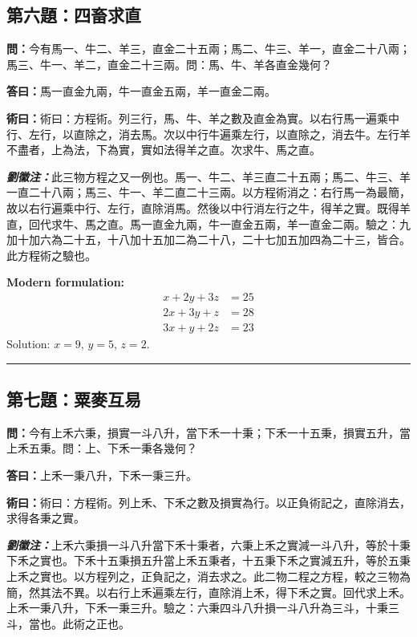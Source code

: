 \documentclass[11pt,a4paper]{article}
\newcommand{\wen}[1]{\textbf{\color{problemcolor}問：}#1\par}
\newcommand{\da}[1]{\textbf{答曰：}#1\par}
\newcommand{\shu}[1]{\textbf{術曰：}#1\par}
\newcommand{\liuhui}[1]{{\color{commentarycolor}\textit{\textbf{劉徽注：}}#1\par}}
\begin{document}
\subsection{第六題：四畜求直}

\wen{今有馬一、牛二、羊三，直金二十五兩；馬二、牛三、羊一，直金二十八兩；馬三、牛一、羊二，直金二十三兩。問：馬、牛、羊各直金幾何？}

\da{馬一直金九兩，牛一直金五兩，羊一直金二兩。}

\shu{術曰：方程術。列三行，馬、牛、羊之數及直金為實。以右行馬一遍乘中行、左行，以直除之，消去馬。次以中行牛遍乘左行，以直除之，消去牛。左行羊不盡者，上為法，下為實，實如法得羊之直。次求牛、馬之直。}

\liuhui{此三物方程之又一例也。馬一、牛二、羊三直二十五兩；馬二、牛三、羊一直二十八兩；馬三、牛一、羊二直二十三兩。以方程術消之：右行馬一為最簡，故以右行遍乘中行、左行，直除消馬。然後以中行消左行之牛，得羊之實。既得羊直，回代求牛、馬之直。馬一直金九兩，牛一直金五兩，羊一直金二兩。驗之：九加十加六為二十五，十八加十五加二為二十八，二十七加五加四為二十三，皆合。此方程術之驗也。}

\textbf{Modern formulation:}
\begin{align*}
x + 2y + 3z &= 25 \\
2x + 3y + z &= 28 \\
3x + y + 2z &= 23
\end{align*}
Solution: $x = 9$, $y = 5$, $z = 2$.

\bigskip
\hrule
\bigskip

\subsection{第七題：粟麥互易}

\wen{今有上禾六秉，損實一斗八升，當下禾一十秉；下禾一十五秉，損實五升，當上禾五秉。問：上、下禾一秉各幾何？}

\da{上禾一秉八升，下禾一秉三升。}

\shu{術曰：方程術。列上禾、下禾之數及損實為行。以正負術記之，直除消去，求得各秉之實。}

\liuhui{上禾六秉損一斗八升當下禾十秉者，六秉上禾之實減一斗八升，等於十秉下禾之實也。下禾十五秉損五升當上禾五秉者，十五秉下禾之實減五升，等於五秉上禾之實也。以方程列之，正負記之，消去求之。此二物二程之方程，較之三物為簡，然其法不異。以右行上禾遍乘左行，直除消上禾，得下禾之實。回代求上禾。上禾一秉八升，下禾一秉三升。驗之：六秉四斗八升損一斗八升為三斗，十秉三斗，當也。此術之正也。}
\end{document}
